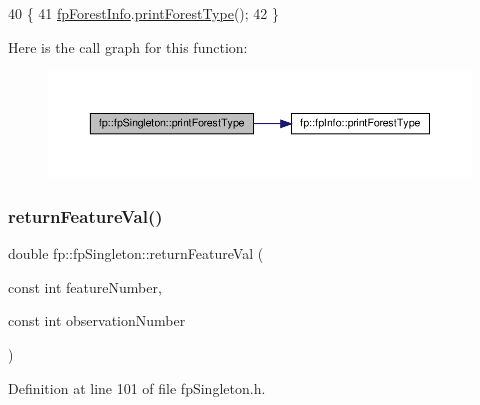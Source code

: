 \begin{DoxyCode}
40                                          \{
41                 \hyperlink{classfp_1_1fpSingleton_a85965009befa72a749ae498fa5b6ccfa}{fpForestInfo}.\hyperlink{classfp_1_1fpInfo_a1acfffe3b13e5cad548f92cd09ff7f46}{printForestType}();
42             \}
\end{DoxyCode}
Here is the call graph for this function\+:\nopagebreak
\begin{figure}[H]
\begin{center}
\leavevmode
\includegraphics[width=350pt]{classfp_1_1fpSingleton_ad9696336521f72c7c6a021608799871e_cgraph}
\end{center}
\end{figure}
\mbox{\label{classfp_1_1fpSingleton_aacc2eb894a219e2fe234743b51fa1a76}} 
\subsubsection{\texorpdfstring{return\+Feature\+Val()}{returnFeatureVal()}}
{\footnotesize\ttfamily double fp\+::fp\+Singleton\+::return\+Feature\+Val (\begin{DoxyParamCaption}\item[{const int}]{feature\+Number,  }\item[{const int}]{observation\+Number }\end{DoxyParamCaption})\hspace{0.3cm}{\ttfamily [inline]}}



Definition at line 101 of file fp\+Singleton.\+h.


